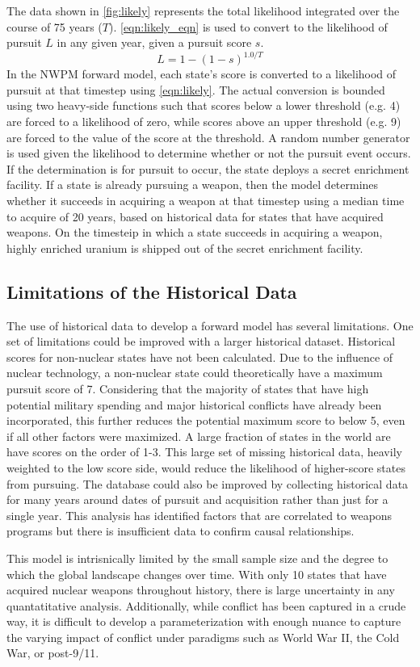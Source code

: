 The data shown in \ref{fig:likely} represents the total likelihood integrated over the course of 75 years ($T$). \ref{eqn:likely_eqn} is used to convert to the likelihood of pursuit $L$ in any given year, given a pursuit score $s$.
\begin{equation}
L = 1 - (1 - s)^{1.0/T}
\label{eqn:likely_eqn}
\end{equation}
In the \gls{NWPM} forward model, each state's score is converted to a likelihood of pursuit at that timestep using \ref{eqn:likely}. The actual conversion is bounded using two heavy-side functions such that scores below a lower threshold (e.g. 4) are forced to a likelihood of zero, while scores above an upper threshold (e.g. 9) are forced to the value of the score at the threshold.   A random number generator is used given the likelihood to determine whether or not the pursuit event occurs. If the determination is for pursuit to occur, the state deploys a secret enrichment facility. If a state is already pursuing a weapon, then the model determines whether it succeeds in acquiring a weapon at that timestep using a median time to acquire of 20 years, based on historical data for states that have acquired weapons. On the timesteip in which a state succeeds in acquiring a weapon, highly enriched uranium is shipped out of the secret enrichment facility.

\subsection{Limitations of the Historical Data}
The use of historical data to develop a forward model has several limitations. One set of limitations could be improved with a larger historical dataset.  Historical scores for non-nuclear states have not been calculated. Due to the influence of nuclear technology, a non-nuclear state could theoretically have a maximum pursuit score of 7. Considering that the majority of states that have high potential military spending and major historical conflicts have already been incorporated, this further reduces the potential maximum score to below 5, even if all other factors were maximized.  A large fraction of states in the world are have scores on the order of 1-3.  This large set of missing historical data, heavily weighted to the low score side, would reduce the likelihood of higher-score states from pursuing.  The database could also be improved by collecting historical data for many years around dates of pursuit and acquisition rather than just for a single year. This analysis has identified factors that are correlated to weapons programs but there is insufficient data to confirm causal relationships.   

This model is intrisnically limited by the small sample size and the degree to which the global landscape changes over time. With only 10 states that have acquired nuclear weapons throughout history, there is large uncertainty in any quantatitative analysis. Additionally, while conflict has been captured in a crude way, it is difficult to develop a parameterization with enough nuance to capture the varying impact of conflict under paradigms such as World War II, the Cold War, or post-9/11.

